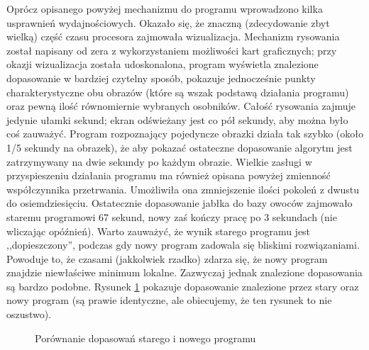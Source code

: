 \documentclass[a4paper,12pt,leqno]{article}
\begin{document}
Oprócz opisanego powyżej mechanizmu do programu wprowadzono kilka usprawnień wydajnościowych. Okazało się, że znaczną (zdecydowanie zbyt wielką) część czasu procesora zajmowała
wizualizacja. Mechanizm rysowania został napisany od zera z wykorzystaniem możliwości kart graficznych; przy okazji wizualizacja została udoskonalona, program wyświetla znalezione
dopasowanie w bardziej czytelny sposób, pokazuje jednocześnie punkty charakterystyczne obu obrazów (które są wszak podstawą działania programu) oraz pewną ilość równomiernie wybranych
osobników. Całość rysowania zajmuje jedynie ułamki sekund; ekran odświeżany jest co pół sekundy, aby można było coś zauważyć. Program rozpoznający pojedyncze obrazki działa tak szybko
(około 1/5 sekundy na obrazek), że aby pokazać ostateczne dopasowanie algorytm jest zatrzymywany na dwie sekundy po każdym obrazie. Wielkie zasługi w przyspieszeniu działania programu
ma również opisana powyżej zmienność współczynnika przetrwania. Umożliwiła ona zmniejszenie ilości pokoleń z dwustu do osiemdziesięciu. Ostatecznie dopasowanie jabłka do bazy owoców
zajmowało staremu programowi 67 sekund, nowy zaś kończy pracę po 3 sekundach (nie wliczając opóźnień). Warto zauważyć, że wynik starego programu jest ,,dopieszczony'', podczas gdy nowy
program zadowala się bliskimi rozwiązaniami. Powoduje to, że czasami (jakkolwiek rzadko) zdarza się, że nowy program znajdzie niewłaściwe minimum lokalne. Zazwyczaj jednak znalezione
dopasowania są bardzo podobne. Rysunek \ref{speedy} pokazuje dopasowanie znalezione przez stary oraz nowy program (są prawie identyczne, ale obiecujemy, że ten rysunek to nie oszustwo).

\begin{figure}\centering
{}\hspace{1mm}
\hspace{1mm}
\caption{Porównanie dopasowań starego i nowego programu}{\label{speedy}}
\end{figure}
\end{document}
